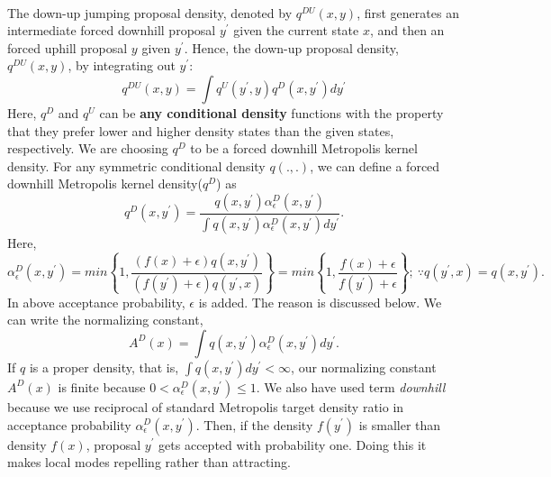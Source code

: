 \documentclass{article}
\begin{document}
\paragraph{}The down-up jumping proposal density, denoted by $q^{DU}(x,y)$, first generates an intermediate forced downhill proposal $y^{'}$ given the current state $x$, and then an forced uphill proposal $y$ given $y^{'}$. Hence, the down-up proposal density, $q^{DU}(x,y)$, by integrating out $y^{'}$:
\begin{equation*}
    q^{DU}(x,y)=\int q^U(y^{'},y) q^D(x,y^{'})dy^{'}
\end{equation*}
Here, $q^D$ and $q^U$ can be \textbf{any conditional density} functions with the property that they prefer lower and higher density states than the given states, respectively. We are choosing $q^D$ to be a forced downhill Metropolis kernel density. For any symmetric conditional density $q(.,.)$, we can define
a forced downhill Metropolis kernel density($q^D$) as
\begin{equation*}
    q^D(x,y^{'})=\frac{q(x,y^{'})\alpha_{\epsilon}^D(x,y^{'})}{\int q(x,y^{'})\alpha_{\epsilon}^D(x,y^{'})dy^{'}}.
\end{equation*}
Here,
\begin{equation*}
    \alpha_{\epsilon}^D(x,y^{'})=min\left\{1,\frac{(f(x)+\epsilon)q(x,y^{'})}{(f(y^{'})+\epsilon)q(y^{'},x)}\right\}=min\left\{1,\frac{f(x)+\epsilon}{f(y^{'})+\epsilon}\right\};\ \because{q(y^{'},x)=q(x,y^{'})}.
\end{equation*}
In above acceptance probability, $\epsilon$ is added. The reason is discussed below. We can write the normalizing constant, $$A^D(x)=\int q(x,y^{'})\alpha_{\epsilon}^D(x,y^{'})dy^{'}.$$
If $q$ is a proper density, that is, $\int q(x,y^{'})dy^{'} < \infty$, our normalizing constant $A^D(x)$ is finite because $0<\alpha_{\epsilon}^D(x,y^{'}) \leq 1$. We also have used term \textit{downhill} because we use reciprocal of standard Metropolis target density ratio in acceptance probability $\alpha_{\epsilon}^D(x,y^{'})$. Then, if the density $f(y^{'})$ is smaller than density $f(x)$, proposal $y^{'}$ gets accepted with probability one. Doing this it makes local modes repelling rather than attracting. 
\end{document}
